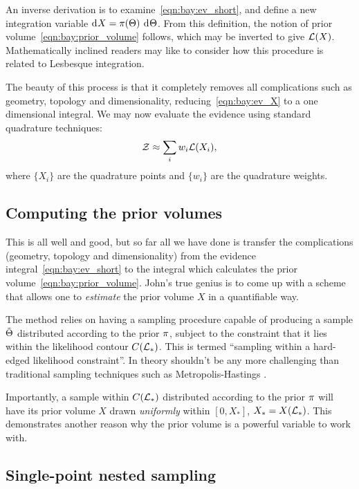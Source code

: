 An inverse derivation is to examine~\eqref{eqn:bay:ev_short}, and define a new integration variable \(\operatorname{d}^{}\!{X} = \pi(\Theta)\:\operatorname{d}^{}\!{\Theta}\). From this definition, the notion of prior volume~\eqref{eqn:bay:prior_volume} follows, which may be inverted to give \(\mathcal{L}(X)\). Mathematically inclined readers may like to consider how this procedure is related to Lesbesque integration.

The beauty of this process is that it completely removes all complications such as geometry, topology and dimensionality, reducing~\eqref{eqn:bay:ev_X} to a one dimensional integral.  We may now evaluate the evidence using standard quadrature techniques:
\begin{equation}
  \mathcal{Z} \approx \sum_{i} w_i \mathcal{L}(X_i),
  \label{eqn:bay:quadrature}
\end{equation}
where \(\{X_i\}\) are the quadrature points and \(\{w_i\}\) are the quadrature weights. 

\subsection{Computing the prior volumes}

This is all well and good, but so far all we have done is transfer the complications (geometry, topology and dimensionality) from the evidence integral~\eqref{eqn:bay:ev_short} to the integral which calculates the prior volume~\eqref{eqn:bay:prior_volume}. John's true genius is to come up with a scheme that allows one to {\em estimate\/} the prior volume \(X\) in a quantifiable way.

The method relies on having a sampling procedure capable of producing a sample \(\tilde{\Theta}\) distributed according to the prior \(\pi\), subject to the constraint that it lies within the likelihood contour \(C(\mathcal{L}_\ast)\).  This is termed ``sampling within a hard-edged likelihood constraint''.  In theory shouldn't be any more challenging than traditional sampling techniques such as Metropolis-Hastings \citep{skilling2006}. 

Importantly, a sample within \(C(\mathcal{L}_\ast)\) distributed according to the prior \(\pi\) will have its prior volume \(X\) drawn {\em uniformly\/} within \([0,X_\ast]\), \(X_\ast=X(\mathcal{L}_\ast)\). This demonstrates another reason why the prior volume is a powerful variable to work with.

\subsection{Single-point nested sampling}

